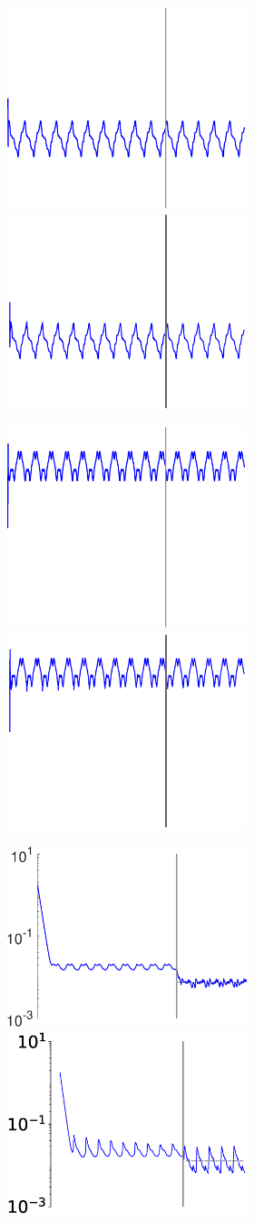 \begin{figure}
\begin{subfigure}{\textwidth}
\begin{subfigure}{\textwidth}
        \includegraphics[height=0.1\linewidth,width=.45\linewidth]{Figures/Fig_T3/MATLAB/ST_T2_Seg2_Theta0.eps}
        \includegraphics[trim=2cm 1cm 2cm 1cm, clip=true,height=0.1\linewidth,width=.45\linewidth]{Figures/Fig_T3/Python/ST_T2_Seg2_Theta0.eps}
        
        \end{subfigure}
        
        
        \textbf{}\begin{subfigure}{\textwidth}
        \centering
        
        \includegraphics[height=0.1\linewidth,width=.45\linewidth]{Figures/Fig_T3/MATLAB/ST_T2_Seg2_Theta1.eps}
        \includegraphics[trim=2cm 1cm 2cm 1cm, clip=true,height=0.1\linewidth,width=.45\linewidth]{Figures/Fig_T3/Python/ST_T2_Seg2_Theta1.eps}
        
        \end{subfigure}
         
        
        \textbf{}\begin{subfigure}{\textwidth}
        \centering
        
        \hspace{-2em}
        \includegraphics[height=0.15\linewidth,width=.45\linewidth]{Figures/Fig_T3/MATLAB/ST_T2_Seg2_MSE.eps}
        \hspace{.5em}
        \includegraphics[height=0.15\linewidth,width=.45\linewidth]{Figures/Fig_T3/Python/ST_T2_Seg2_MSE.eps}
        

\end{subfigure}
\end{subfigure}
\end{figure}
